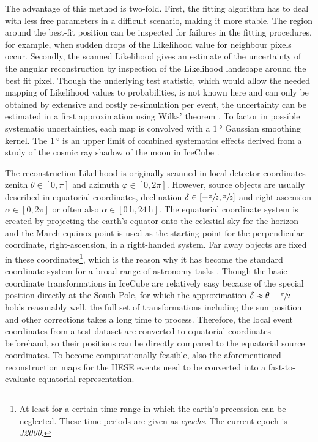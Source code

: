 The advantage of this method is two-fold.
First, the fitting algorithm has to deal with less free parameters in a difficult scenario, making it more stable.
The region around the best-fit position can be inspected for failures in the fitting procedures, for example, when sudden drops of the Likelihood value for neighbour pixels occur.
Secondly, the scanned Likelihood gives an estimate of the uncertainty of the angular reconstruction by inspection of the Likelihood landscape around the best fit pixel.
Though the underlying test statistic, which would allow the needed mapping of Likelihood values to probabilities, is not known here and can only be obtained by extensive and costly re-simulation per event, the uncertainty can be estimated in a first approximation using Wilks' theorem \cite{Wilks:1938dza,casella2002statistical,bohm2010introduction}.
To factor in possible systematic uncertainties, each map is convolved with a $\SI{1}{\degree}$ Gaussian smoothing kernel.
The $\SI{1}{\degree}$ is an upper limit of combined systematics effects derived from a study of the cosmic ray shadow of the moon in IceCube \cite{Aartsen:2013jdh,Aartsen:2013zka}.

The reconstruction Likelihood is originally scanned in local detector coordinates zenith $\theta\in[0, \pi]$ and azimuth $\varphi\in[0, 2\pi]$.
However, source objects are usually described in equatorial coordinates, declination $\delta\in[-\sfrac{\pi}{2}, \sfrac{\pi}{2}]$ and right-ascension $\alpha\in[0, 2\pi]$ or often also $\alpha\in[\SI{0}{\hour}, \SI{24}{\hour}]$.
The equatorial coordinate system is created by projecting the earth's equator onto the celestial sky for the horizon and the March equinox point is used as the starting point for the perpendicular coordinate, right-ascension, in a right-handed system.
Far away objects are fixed in these coordinates\footnote{At least for a certain time range in which the earth's precession can be neglected. These time periods are given as \emph{epochs}. The current epoch is \emph{J2000}.}, which is the reason why it has become the standard coordinate system for a broad range of astronomy tasks \cite{Hohenkerk:1992AstroAlmanac}.
Though the basic coordinate transformations in IceCube are relatively easy because of the special position directly at the South Pole, for which the approximation $\delta \approx \theta - \sfrac{\pi}{2}$ holds reasonably well, the full set of transformations including the sun position and other corrections takes a long time to process.
Therefore, the local event coordinates from a test dataset are converted to equatorial coordinates beforehand, so their positions can be directly compared to the equatorial source coordinates.
To become computationally feasible, also the aforementioned reconstruction maps for the HESE events need to be converted into a fast-to-evaluate equatorial representation.

